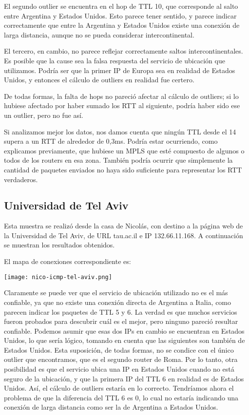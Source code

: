 El segundo outlier se encuentra en el hop de TTL 10, que corresponde al salto
entre Argentina y Estados Unidos. Esto parece tener sentido, y parece indicar
correctamente que entre la Argentina y Estados Unidos existe una conexión de
larga distancia, aunque no se pueda considerar intercontinental.

El tercero, en cambio, no parece reflejar correctamente saltos
intercontinentales. Es posible que la cause sea la falsa respuesta del servicio
de ubicación que utilizamos. Podría ser que la primer IP de Europa sea en
realidad de Estados Unidos, y entonces el cálculo de outliers en realidad fue
certero.

De todas formas, la falta de hops no pareció afectar al cálculo de outliers;
si lo hubiese afectado por haber sumado los RTT al siguiente, podría haber sido
ese un outlier, pero no fue así. 

Si analizamos mejor los datos, nos damos cuenta que ningún
TTL desde el 14 supera a un RTT de alrededor de 0,3ms. Podría estar ocurriendo,
como explicamos previamente, que hubiese un MPLS que esté compuesto de algunos
o todos de los routers en esa zona. También podría ocurrir que simplemente
la cantidad de paquetes enviados no haya sido suficiente para representar los
RTT verdaderos.


\subsection{Universidad de Tel Aviv}
Esta muestra se realizó desde la casa de Nicolás, con destino a la página web
de la Universidad de Tel Aviv, de URL tau.ac.il e IP 132.66.11.168.
A continuación se muestran los resultados obtenidos.



El mapa de conexiones correspondiente es:

\begin{center}
    \texttt{[image: nico-icmp-tel-aviv.png]}
\end{center}

Claramente se puede ver que el servicio de ubicación utilizado no es el más
confiable, ya que no existe una conexión directa de Argentina a Italia, como
parecen indicar los paquetes de TTL 5 y 6.
La verdad es que muchos servicios fueron probados para descubrir
cuál es el mejor, pero ninguno pareció resultar confiable.
Podemos asumir que esas dos IPs en cambio se encuentran en Estados Unidos,
lo que sería lógico, tomando en cuenta que las siguientes son también de 
Estados Unidos. Esta suposición, de todas formas, no se condice con el único
outlier que encontramos, que es el segundo router de Roma. Por lo tanto,
otra posibilidad es que el servicio ubica una IP en Estados Unidos cuando no
está seguro de la ubicación, y que la primera IP del TTL 6 en realidad es 
de Estados Unidos. Así, el cálculo de outliers estaría en lo correcto. 
Tendríamos ahora el problema de que la diferencia del TTL 6 es 0, lo cual no
estaría indicando una conexión de larga distancia como ser la de Argentina a Estados
Unidos.

